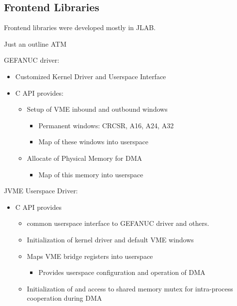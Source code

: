 \subsection{Frontend Libraries}

Frontend libraries were developed mostly in JLAB.

Just an outline ATM

GEFANUC driver:
\begin{itemize}
\item Customized Kernel Driver and Userspace Interface
\item C API provides:
   \begin{itemize}
   \item Setup of VME inbound and outbound windows
      \begin{itemize}
      \item Permanent windows: CRCSR, A16, A24, A32
      \item Map of these windows into userspace
      \end{itemize}
   \item Allocate of Physical Memory for DMA
      \begin{itemize}
      \item Map of this memory into userspace
      \end{itemize}
   \end{itemize}
\end{itemize}

JVME Userspace Driver:
\begin{itemize}
\item C API provides
  \begin{itemize}
  \item common userspace interface to GEFANUC driver and others.
  \item Initialization of kernel driver and default VME windows
  \item Maps VME bridge registers into userspace
    \begin{itemize}
    \item Provides userspace configuration and operation of DMA
    \end{itemize}
  \item Initialization of and access to shared memory mutex for intra-process cooperation during DMA
  \end{itemize}
\end{itemize}

